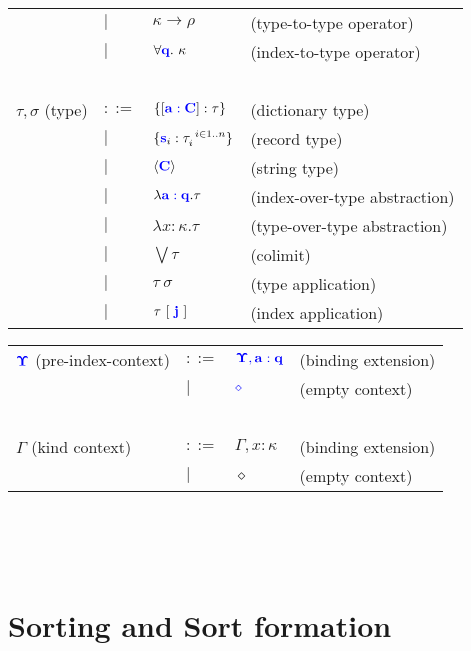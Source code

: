 \documentclass{article}
\newcommand{\blu}[1]{\mathbf{\color{blue}{#1}}}
\begin{document}
\begin{tabular}{llll}
                     & $\mid$ & $\kappa \to \rho$ & (type-to-type operator)\\
                     & $\mid$ & $\forall \blu{q}.~\kappa$ & (index-to-type operator) \\~\\
$\tau,\sigma$ (type) & $::=$ & $\{[\blu{a : C}] : \tau \}$ & (dictionary type) \\ 
       & $\mid$ & $\{ \blu{s}_i : \tau_i^{~i \in 1..n} \}$ & (record type) \\
       & $\mid$ & $\langle \blu{C} \rangle$ & (string type) \\
       & $\mid$ & $\lambda \blu{a : q} . \tau$ & (index-over-type abstraction) \\
       & $\mid$ & $\lambda x : \kappa. \tau$ & (type-over-type abstraction) \\
       & $\mid$ & $\bigvee \tau$ & (colimit) \\
       & $\mid$ & $\tau~\sigma$ & (type application) \\
       & $\mid$ & $\tau~[~\blu{j}~]$ & (index application)
\end{tabular}

\begin{tabular}{llll}
$\blu{\Upsilon}$ (pre-index-context) & $::=$  & $\blu{\Upsilon,a : q}$ & (binding extension) \\
                                     & $\mid$ & $\blu{\diamond}$ & (empty context) \\ ~\\
$\Gamma$ (kind context) & $::=$ & $\Gamma,x : \kappa$ & (binding extension) \\
                        & $\mid$ & $\diamond$ & (empty context) 
\end{tabular}\\~\\~\\

\section*{Sorting and Sort formation}
\end{document}
